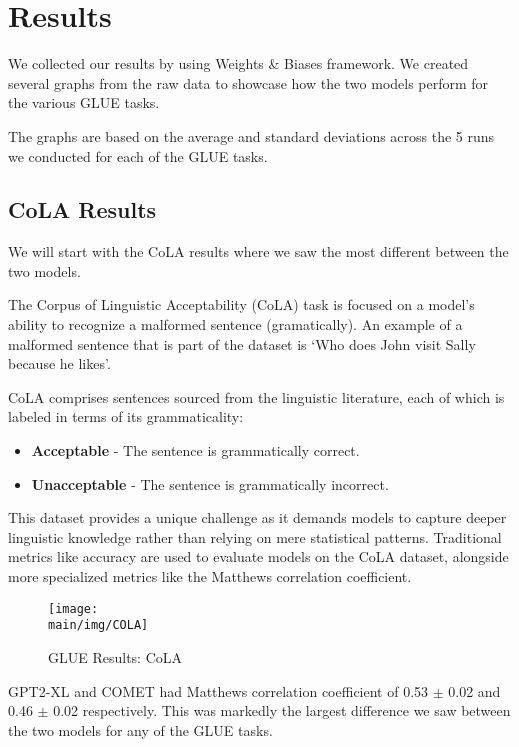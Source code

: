 \documentclass[\main/thesis.tex]{subfiles}
\begin{document}
\chapter{Results}

We collected our results by using Weights \& Biases framework. We created several
graphs from the raw data to showcase how the two models perform for the various GLUE tasks. 

The graphs are based on the average and standard deviations across the 5 runs we 
conducted for each of the GLUE tasks. 

\section{CoLA Results}\label{sec:cola_results}

We will start with the CoLA results where we saw the most different between the two models. 

The Corpus of Linguistic Acceptability (CoLA) task is focused on a model's ability 
to recognize a malformed sentence (gramatically). An example of a malformed sentence that is 
part of the dataset is `Who does John visit Sally because he likes'.

CoLA comprises sentences sourced from the linguistic literature, each of which is labeled in terms of its grammaticality:
\begin{itemize}
    \item \textbf{Acceptable} - The sentence is grammatically correct.
    \item \textbf{Unacceptable} - The sentence is grammatically incorrect.
\end{itemize}

This dataset provides a unique challenge as it demands models to capture deeper linguistic knowledge rather than relying on mere statistical patterns. 
Traditional metrics like accuracy are used to evaluate models on the CoLA dataset, alongside more specialized metrics like the Matthews correlation coefficient.

\begin{figure}
    \texttt{[image: \\main/img/COLA]}
    \caption[GLUE Results: CoLA] {GLUE Results: CoLA}
    \label{fig:cola_fig}
\end{figure}

GPT2-XL and COMET had  Matthews correlation coefficient of 0.53 $\pm$ 0.02 and 0.46 $\pm$ 0.02 respectively. This was markedly the largest
difference we saw between the two models for any of the GLUE tasks. 
\end{document}
